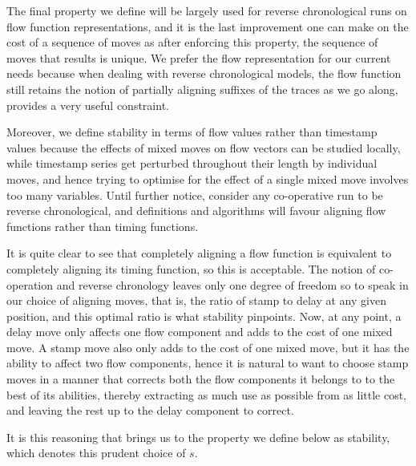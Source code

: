 \documentclass[runningheads]{llncs}
\begin{document}
    The final property we define will be largely used for reverse chronological runs on flow function representations, and it is the last improvement one can make on the cost of a sequence of moves as after enforcing this property, the sequence of moves that results is unique. 
    We prefer the flow representation for our current needs because when dealing with reverse chronological models, the flow function still retains the notion of partially aligning suffixes of the traces as we go along, provides a very useful constraint. 
    
    Moreover, we define stability in terms of flow values rather than timestamp values because the effects of mixed moves on flow vectors can be studied locally, while timestamp series get perturbed throughout their length by individual moves, and hence trying to optimise for the effect of a single mixed move involves too many variables. 
  Until further notice, consider any co-operative run to be reverse chronological, and definitions and algorithms will favour aligning flow functions rather than timing functions. 
    
  It is quite clear to see that completely aligning a flow function is equivalent to completely aligning its timing function, so this is acceptable. 
    The notion of co-operation and reverse chronology leaves only one degree of freedom so to speak in our choice of aligning moves, that is, the ratio of stamp to delay at any given position, and this optimal ratio is what stability pinpoints. %
    Now, at any point, a delay move only affects one flow component and adds to the cost of one mixed move.
    A stamp move also only adds to the cost of one mixed move, but it has the ability to affect two flow components, hence it is natural to want to choose stamp moves in a manner that corrects both the flow components it belongs to to the best of its abilities, thereby extracting as much use as possible from as little cost, and leaving the rest up to the delay component to correct. 
    
    It is this reasoning that brings us to the property we define below as stability, which denotes this prudent choice of $s$. 
    
\end{document}
